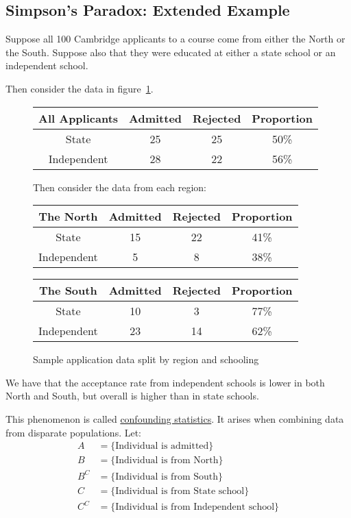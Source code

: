 \documentclass[../Main.tex]{subfiles}
\begin{document}
\subsection{Simpson's Paradox: Extended Example}
Suppose all 100 Cambridge applicants to a course come from either the North or the South. Suppose also that they were educated at either a state school or an independent school.\par
Then consider the data in figure~\ref{figApplicationData}.\par
\begin{figure}[ht]
    \centering
    \begin{tabular}{c|c|c|c}
        All Applicants& Admitted & Rejected & Proportion \\
        \hline
        State & 25 & 25 & 50\% \\
        Independent & 28 & 22 & 56\%
    \end{tabular}
    \par
    Then consider the data from each region:\par
    \begin{tabular}{c|c|c|c}
        The North & Admitted & Rejected & Proportion \\
        \hline
        State & 15 & 22 & 41\% \\
        Independent & 5 & 8 & 38\% \\
        \hline
    \end{tabular}
    \begin{tabular}{c|c|c|c}
        The South & Admitted & Rejected & Proportion \\
        \hline
        State & 10 & 3 & 77\% \\
        Independent & 23 & 14 & 62\%
    \end{tabular}
    \caption{Sample application data split by region and schooling}
    \label{figApplicationData}
\end{figure}
We have that the acceptance rate from independent schools is lower in both North and South, but overall is higher than in state schools.\par
This phenomenon is called \underline{confounding statistics}. It arises when combining data from disparate populations. Let:
\begin{align*}
    A &= \{\text{Individual is admitted}\} \\
    B &= \{\text{Individual is from North}\} \\
    B^C &= \{\text{Individual is from South}\} \\
    C &= \{\text{Individual is from State school}\} \\
    C^C &= \{\text{Individual is from Independent school}\}
\end{align*}
\end{document}
